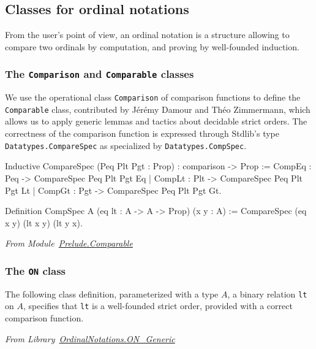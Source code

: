 \subsection{Classes for ordinal notations}

From the \coq{} user's point of view, an ordinal notation is
a structure allowing to compare two ordinals by computation, and proving by well-founded induction.

\subsubsection{The \texttt{Comparison} and \texttt{Comparable} classes}

We use the operational class \texttt{Comparison} of comparison functions to define the \texttt{Comparable} class, contributed by Jérémy Damour and Théo Zimmermann, which allows us to apply generic lemmas and tactics about decidable strict orders.
The correctness of the comparison function is expressed through Stdlib's type 
\texttt{Datatypes.CompareSpec} as specialized by \texttt{Datatypes.CompSpec}.

\begin{Coqsrc}
  Inductive CompareSpec (Peq Plt Pgt : Prop) :
  comparison -> Prop :=
    CompEq : Peq -> CompareSpec Peq Plt Pgt Eq
  | CompLt : Plt -> CompareSpec Peq Plt Pgt Lt
  | CompGt : Pgt -> CompareSpec Peq Plt Pgt Gt.

Definition CompSpec {A} (eq lt : A -> A -> Prop) (x y : A) :=
 CompareSpec (eq x y) (lt x y) (lt y x).
\end{Coqsrc}

\emph{From Module~\href{../theories/html/hydras.Prelude/mparable.html\#Hvariant}{Prelude.Comparable}}

\label{sect:comparable-def}







\subsubsection{The \texttt{ON} class}

The following class definition, parameterized with a type $A$, a binary relation \texttt{lt} on $A$, specifies that \texttt{lt} is a well-founded strict order, provided with a correct comparison function.


\vspace{4pt}
\noindent\emph{From
Library~\href{../theories/html/hydras.OrdinalNotations.ON_Generic.html}{OrdinalNotations.ON\_Generic}}

